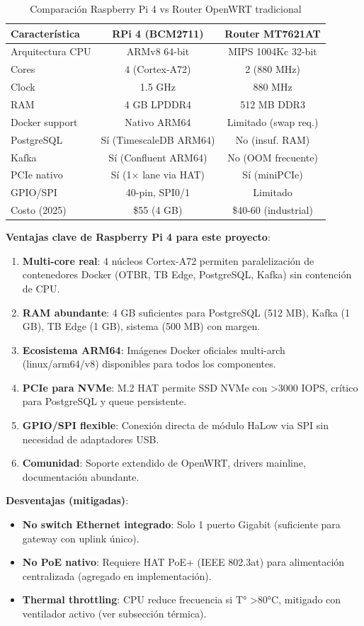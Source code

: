 \begin{table}[h]
\centering
\small
\begin{tabular}{|l|c|c|}
\hline
\textbf{Característica} & \textbf{RPi 4 (BCM2711)} & \textbf{Router MT7621AT} \\
\hline
Arquitectura CPU & ARMv8 64-bit & MIPS 1004Kc 32-bit \\
Cores & 4 (Cortex-A72) & 2 (880 MHz) \\
Clock & 1.5 GHz & 880 MHz \\
RAM & 4 GB LPDDR4 & 512 MB DDR3 \\
Docker support & Nativo ARM64 & Limitado (swap req.) \\
PostgreSQL & Sí (TimescaleDB ARM64) & No (insuf. RAM) \\
Kafka & Sí (Confluent ARM64) & No (OOM frecuente) \\
PCIe nativo & Sí (1$\times$ lane via HAT) & Sí (miniPCIe) \\
GPIO/SPI & 40-pin, SPI0/1 & Limitado \\
Costo (2025) & \$55 (4 GB) & \$40-60 (industrial) \\
\hline
\end{tabular}
\caption{Comparación Raspberry Pi 4 vs Router OpenWRT tradicional}
\end{table}

\textbf{Ventajas clave de Raspberry Pi 4 para este proyecto}:
\begin{enumerate}
    \item \textbf{Multi-core real}: 4 núcleos Cortex-A72 permiten paralelización de contenedores Docker (OTBR, TB Edge, PostgreSQL, Kafka) sin contención de CPU.
    \item \textbf{RAM abundante}: 4 GB suficientes para PostgreSQL (512 MB), Kafka (1 GB), TB Edge (1 GB), sistema (500 MB) con margen.
    \item \textbf{Ecosistema ARM64}: Imágenes Docker oficiales multi-arch (linux/arm64/v8) disponibles para todos los componentes.
    \item \textbf{PCIe para NVMe}: M.2 HAT permite SSD NVMe con >3000 IOPS, crítico para PostgreSQL y queue persistente.
    \item \textbf{GPIO/SPI flexible}: Conexión directa de módulo HaLow via SPI sin necesidad de adaptadores USB.
    \item \textbf{Comunidad}: Soporte extendido de OpenWRT, drivers mainline, documentación abundante.
\end{enumerate}

\textbf{Desventajas (mitigadas)}:
\begin{itemize}
    \item \textbf{No switch Ethernet integrado}: Solo 1 puerto Gigabit (suficiente para gateway con uplink único).
    \item \textbf{No PoE nativo}: Requiere HAT PoE+ (IEEE 802.3at) para alimentación centralizada (agregado en implementación).
    \item \textbf{Thermal throttling}: CPU reduce frecuencia si T° >80°C, mitigado con ventilador activo (ver subsección térmica).
\end{itemize}


